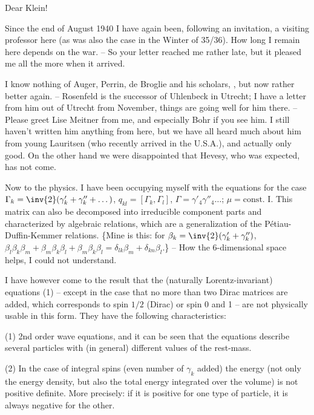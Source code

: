 \date{January 14, 1941}

Dear Klein!

Since the end of August 1940 I have again been, following an invitation, a visiting professor here (as was also the case in the Winter of 35/36). How long I remain here depends on the war. -- So your letter reached me rather late, but it pleased me all the more when it arrived.

I know nothing of Auger, Perrin, de Broglie and his scholars, , but now rather better again. -- Rosenfeld is the successor of Uhlenbeck in Utrecht; I have a letter from him out of Utrecht from November, things are going well for him there. -- Please greet  Lise Meitner from me, and especially Bohr if you see him. I still haven't written him anything from here, but we have all heard much about him from young Lauritsen (who recently arrived in the U.S.A.), and actually only good. On the other hand we were disappointed that Hevesy, who was expected, has not come.

Now to the physics. I have been occupying myself with the equations
for the case $\Gamma_k = \inv{2}(\gamma'_k + \gamma''_k + \dots)$, $q_{kl} = [\Gamma_k, \Gamma_l]$, $\Gamma = \gamma'_4\gamma''_4\dots$; $\mu = \text{const. I}$. This matrix can also be decomposed into irreducible component parts and characterized by algebraic relations, which are a generalization of the P\'etiau-Duffin-Kemmer relations. \{Mine is this: for $\beta_k = \inv{2}(\gamma'_k + \gamma''_k)$, $\beta_l\beta_k\beta_m + \beta_m\beta_k\beta_l + \beta_m\beta_k\beta_l = \delta_{lk}\beta_m + \delta_{kn}\beta_l$.\} -- How the 6-dimensional space helps, I could not understand.

I have however come to the result that the (naturally Lorentz-invariant) equations (1) -- except in the case that no more than two Dirac matrices are added, which corresponds to spin $1/2$ (Dirac) or spin 0 and 1 -- are not physically usable in this form. They have the following characteristics:

(1)  2nd order wave equations, and it can be seen that the equations describe several particles with (in general) different values of the rest-mass.

(2) In the case of integral spins (even number of $\gamma_k$ added) the energy (not only the energy density, but also the total energy integrated over the volume) is not positive definite. More precisely: if it is positive for one type of particle, it is always negative for the other.

